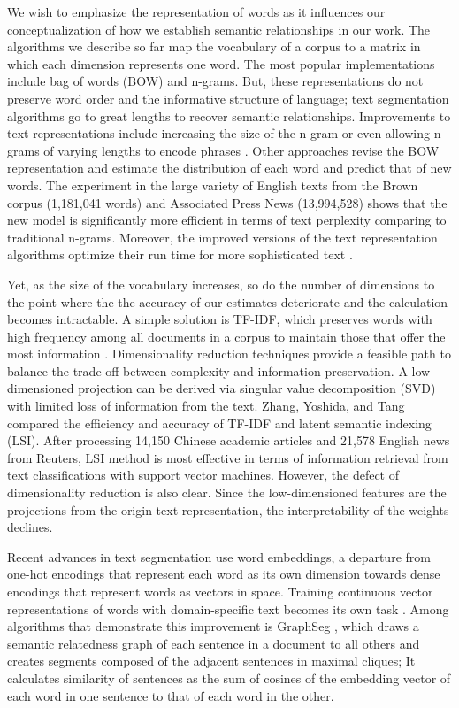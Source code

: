\documentclass[letterpaper, 12pt]{article}
\begin{document}
We wish to emphasize the representation of words as it influences our conceptualization of how we establish semantic relationships in our work. The algorithms we describe so far map the vocabulary of a corpus to a matrix in which each dimension represents one word. The most popular implementations include bag of words (BOW) and n-grams. But, these representations do not preserve word order and the informative structure of language; text segmentation algorithms go to great lengths to recover semantic relationships. Improvements to text representations include increasing the size of the n-gram or even allowing n-grams of varying lengths to encode phrases \cite{mikolov-etal-2013-skipgram}. Other approaches \cite{bengio-2003-neural} revise the BOW representation and estimate the distribution of each word and predict that of new words. The experiment in the large variety of English texts from the Brown corpus (1,181,041 words) and Associated Press News (13,994,528) shows that the new model is significantly more efficient in terms of text perplexity comparing to traditional n-grams. Moreover, the improved versions of the text representation algorithms optimize their run time for more sophisticated text \cite{luong-2013-rnn} \cite{morin-2005-hierarchical}.

Yet, as the size of the vocabulary increases, so do the number of dimensions to the point where the the accuracy of our estimates deteriorate and the calculation becomes intractable. A simple solution is TF-IDF, which preserves words with high frequency among all documents in a corpus to maintain those that offer the most information \cite{ramos-2003-tf-idf}. Dimensionality reduction techniques provide a feasible path to balance the trade-off between complexity and information preservation. A low-dimensioned projection can be derived via singular value decomposition (SVD) with limited loss of information from the text. Zhang, Yoshida, and Tang \cite{zhang-2011-lsi} compared the efficiency and accuracy of TF-IDF and latent semantic indexing (LSI). After processing 14,150 Chinese academic articles and 21,578 English news from Reuters, LSI method is most effective in terms of information retrieval from text classifications with support vector machines. However, the defect of dimensionality reduction is also clear. Since the low-dimensioned features are the projections from the origin text representation, the interpretability of the weights declines.

Recent advances in text segmentation use word embeddings, a departure from one-hot encodings that represent each word as its own dimension towards dense encodings that represent words as vectors in space. Training continuous vector representations of words with domain-specific text becomes its own task \cite{mikolov-etal-2013-efficient}. Among algorithms that demonstrate this improvement is GraphSeg \cite{glavas-etal-2016-unsupervised}, which draws a semantic relatedness graph of each sentence in a document to all others and creates segments composed of the adjacent sentences in maximal cliques; It calculates similarity of sentences as the sum of cosines of the embedding vector of each word in one sentence to that of each word in the other.
\end{document}
